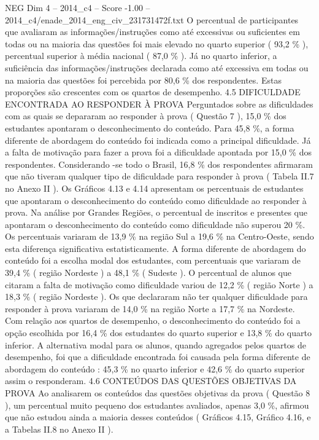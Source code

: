 \begin{textsample}{NEG Dim 4 – 2014\_c4 – Score -1.00 – 2014\_c4/enade\_2014\_eng\_civ\_231731472f.txt}
O percentual de participantes que avaliaram as informações/instruções como até excessivas ou suficientes em todas ou na maioria das questões foi mais elevado no quarto superior ( 93,2 \% ), percentual superior à média nacional ( 87,0 \% ).
Já no quarto inferior, a suficiência das informações/instruções declarada como até excessiva em todas ou na maioria das questões foi percebida por 80,6 \% dos respondentes.
Estas proporções são crescentes com os quartos de desempenho. 4.5 DIFICULDADE ENCONTRADA AO RESPONDER À PROVA Perguntados sobre as dificuldades com as quais se depararam ao responder à prova ( Questão 7 ), 15,0 \% dos estudantes apontaram o desconhecimento do conteúdo.
Para 45,8 \%, a forma diferente de abordagem do conteúdo foi indicada como a principal dificuldade.
Já a falta de motivação para fazer a prova foi a dificuldade apontada por 15,0 \% dos respondentes.
Considerando -se todo o Brasil, 16,8 \% dos respondentes afirmaram que não tiveram qualquer tipo de dificuldade para responder à prova ( Tabela II.7 no Anexo II ).
Os Gráficos 4.13 e 4.14 apresentam os percentuais de estudantes que apontaram o desconhecimento do conteúdo como dificuldade ao responder à prova.
Na análise por Grandes Regiões, o percentual de inscritos e presentes que apontaram o desconhecimento do conteúdo como dificuldade não superou 20 \%.
Os percentuais variaram de 13,9 \% na região Sul a 19,6 \% na Centro-Oeste, sendo esta diferença significativa estatisticamente.
A forma diferente de abordagem do conteúdo foi a escolha modal dos estudantes, com percentuais que variaram de 39,4 \% ( região Nordeste ) a 48,1 \% ( Sudeste ).
O percentual de alunos que citaram a falta de motivação como dificuldade variou de 12,2 \% ( região Norte ) a 18,3 \% ( região Nordeste ).
Os que declararam não ter qualquer dificuldade para responder à prova variaram de 14,0 \% na região Norte a 17,7 \% na Nordeste.
Com relação aos quartos de desempenho, o desconhecimento do conteúdo foi a opção escolhida por 16,4 \% dos estudantes do quarto superior e 13,8 \% do quarto inferior.
A alternativa modal para os alunos, quando agregados pelos quartos de desempenho, foi que a dificuldade encontrada foi causada pela forma diferente de abordagem do conteúdo : 45,3 \% no quarto inferior e 42,6 \% do quarto superior assim o responderam. 4.6 CONTEÚDOS DAS QUESTÕES OBJETIVAS DA PROVA Ao analisarem os conteúdos das questões objetivas da prova ( Questão 8 ), um percentual muito pequeno dos estudantes avaliados, apenas 3,0 \%, afirmou que não estudou ainda a maioria desses conteúdos ( Gráficos 4.15, Gráfico 4.16, e a Tabelas II.8 no Anexo II ).

\end{textsample}
